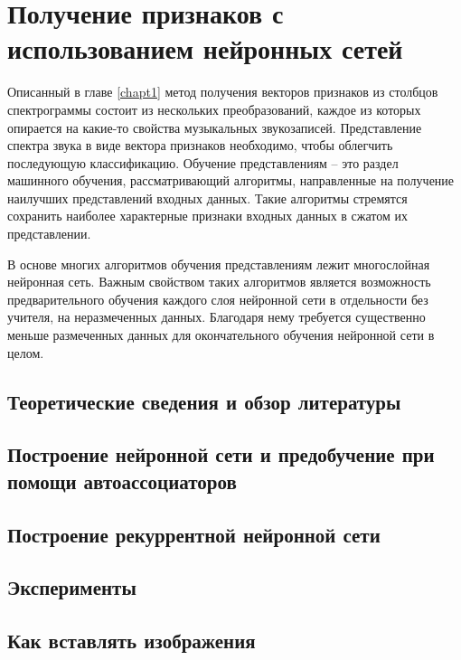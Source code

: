 \chapter{Получение признаков с использованием нейронных сетей}
\label{chapt2}

Описанный в главе \ref{chapt1} метод получения векторов признаков из столбцов
спектрограммы состоит из нескольких преобразований, каждое из которых опирается
на какие-то свойства музыкальных звукозаписей. Представление спектра звука в
виде вектора признаков необходимо, чтобы облегчить последующую классификацию.
Обучение представлениям -- это раздел машинного обучения, рассматривающий
алгоритмы, направленные на получение наилучших представлений входных данных.
Такие алгоритмы стремятся сохранить наиболее характерные признаки входных данных
в сжатом их представлении.

В основе многих алгоритмов обучения представлениям лежит многослойная нейронная
сеть. Важным свойством таких алгоритмов является возможность предварительного
обучения каждого слоя нейронной сети в отдельности без учителя, на неразмеченных
данных. Благодаря нему требуется существенно меньше размеченных данных для
окончательного обучения нейронной сети в целом.



\section{Теоретические сведения и обзор литературы}

\section{Построение нейронной сети и предобучение при помощи автоассоциаторов}

\section{Построение рекуррентной нейронной сети}

\section{Эксперименты}

\section{Как вставлять изображения} \label{sect2_2}

